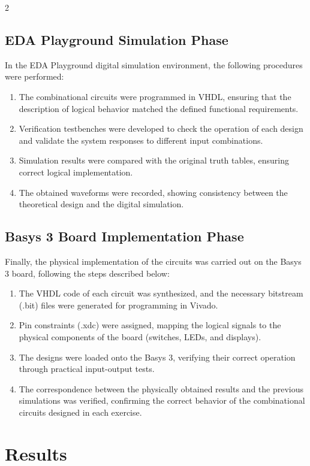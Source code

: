 \documentclass{article}
\begin{document}
\begin{multicols}{2}
\subsection{EDA Playground Simulation Phase}
In the EDA Playground digital simulation environment, the following procedures were performed: 
\begin{enumerate}
    \item The combinational circuits were programmed in VHDL, ensuring that the description of logical behavior matched the defined functional requirements. 
    \item Verification testbenches were developed to check the operation of each design and validate the system responses to different input combinations. 
    \item Simulation results were compared with the original truth tables, ensuring correct logical implementation. 
    \item The obtained waveforms were recorded, showing consistency between the theoretical design and the digital simulation. 
\end{enumerate}

\subsection{Basys 3 Board Implementation Phase}
Finally, the physical implementation of the circuits was carried out on the Basys 3 board, following the steps described below: 
\begin{enumerate}
    \item The VHDL code of each circuit was synthesized, and the necessary bitstream (.bit) files were generated for programming in Vivado. 
    \item Pin constraints (.xdc) were assigned, mapping the logical signals to the physical components of the board (switches, LEDs, and displays). 
    \item The designs were loaded onto the Basys 3, verifying their correct operation through practical input-output tests. 
    \item The correspondence between the physically obtained results and the previous simulations was verified, confirming the correct behavior of the combinational circuits designed in each exercise. 
\end{enumerate}

\section{Results}\label{Results}


\end{multicols}
\end{document}
